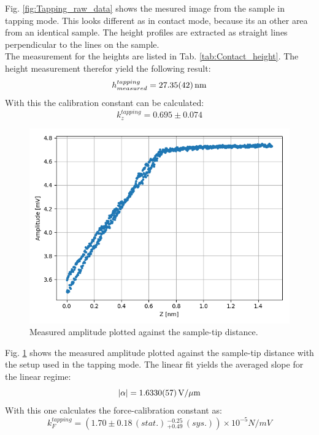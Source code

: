 \documentclass[%
 reprint,
amsmath,amssymb,
pra,
]{revtex4-1}
\begin{document}
Fig. \ref{fig:Tapping_raw_data} shows the mesured image from the sample in tapping mode. This looks different as in contact mode, because its an other area from an identical sample. The height profiles are extracted as straight lines perpendicular to the lines on the sample. \\
The measurement for the heights are listed in Tab. \ref{tab:Contact_height}. The height measurement therefor yield the following result:
\begin{equation*}
h_{measured}^{tapping} = \SI{27.35 \pm 0.42}{nm}
\end{equation*}
With this the calibration constant can be calculated:
\begin{equation*}
k_z^{tapping} = 0.695 \pm 0.074
\end{equation*}

\begin{figure}
\centering
\includegraphics[scale=0.5]{Bilder/Tapping_Mode/Snap_in_curve.PNG}
\caption{Measured amplitude plotted against the sample-tip distance.}
\label{fig:Tapping_snap_in}
\end{figure}

Fig. \ref{fig:Tapping_snap_in} shows the measured amplitude plotted against the sample-tip distance with the setup used in the tapping mode. The linear fit yields the averaged slope for the linear regime:
\begin{equation*} 
|\alpha| = \SI{1.6330 \pm 0.0057}{V \per \mu m}
\end{equation*}
With this one calculates the force-calibration constant as:
\begin{equation*}
k_F^{tapping} = (1.70 \pm 0.18 \, (stat.) \, _{+ 0.49} ^{- 0.25} \, (sys.)) \times 10^{-5} \si{N \per mV}
\end{equation*} \\
\end{document}
